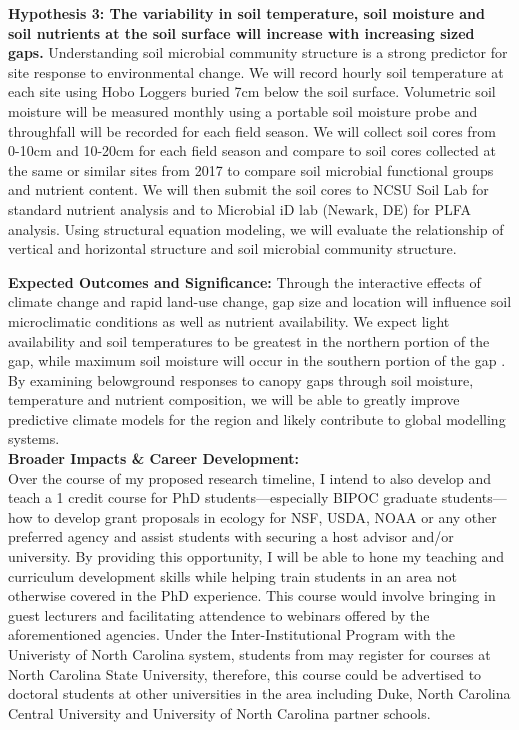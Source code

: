 \documentclass[11pt]{article}\usepackage[]{graphicx}\usepackage[]{color}
\begin{document}
{ \textbf{Hypothesis 3: The variability in soil temperature, soil moisture and soil nutrients at the soil surface will increase with increasing sized gaps.}} Understanding soil microbial community structure is a strong predictor for site response to environmental change. We will record hourly soil temperature at each site using Hobo Loggers buried 7cm below the soil surface. Volumetric soil moisture will be measured monthly using a portable soil moisture probe and throughfall will be recorded for each field season. We will collect soil cores from 0-10cm and 10-20cm for each field season and compare to soil cores collected at the same or similar sites from 2017 to compare soil microbial functional groups and nutrient content. We will then submit the soil cores to NCSU Soil Lab for standard nutrient analysis and to Microbial iD lab (Newark, DE) for PLFA analysis. Using structural equation modeling, we will evaluate the relationship of vertical and horizontal structure and soil microbial community structure.
  
\textbf{Expected Outcomes and Significance:} Through the interactive effects of climate change and rapid land-use change, gap size and location will influence soil microclimatic conditions as well as nutrient availability. We expect light availability and soil temperatures to be greatest in the northern portion of the gap, while maximum soil moisture will occur in the southern portion of the gap \citep{Schatz2012, Raymond2006}.  By examining belowground responses to canopy gaps through soil moisture, temperature and nutrient composition, we will be able to greatly improve predictive climate models for the region and likely contribute to global modelling systems. \\

{\noindent\Large{\textbf{Broader Impacts \& Career Development:}}}\\
Over the course of my proposed research timeline, I intend to also develop and teach a 1 credit course for PhD students---especially BIPOC graduate students---how to develop grant proposals in ecology for NSF, USDA, NOAA or any other preferred agency and assist students with securing a host advisor and/or university. By providing this opportunity, I will be able to hone my teaching and curriculum development skills while helping train students in an area not otherwise covered in the PhD experience. This course would involve bringing in guest lecturers and facilitating attendence to webinars offered by the aforementioned agencies.
Under the Inter-Institutional Program with the Univeristy of North Carolina system, students from may register for courses at North Carolina State University, therefore, this course could be advertised to doctoral students at other universities in the area including Duke, North Carolina Central University and University of North Carolina partner schools. 
\end{document}
